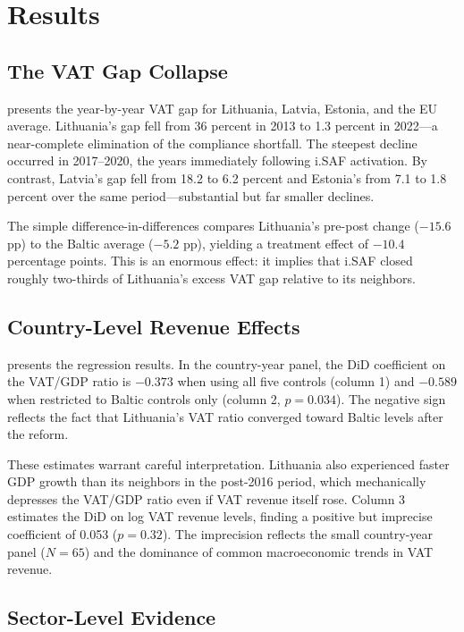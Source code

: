 \documentclass[12pt]{article}
\begin{document}
\section{Results}

\subsection{The VAT Gap Collapse}

 presents the year-by-year VAT gap for Lithuania, Latvia, Estonia, and the EU average. Lithuania's gap fell from 36 percent in 2013 to 1.3 percent in 2022---a near-complete elimination of the compliance shortfall. The steepest decline occurred in 2017--2020, the years immediately following i.SAF activation. By contrast, Latvia's gap fell from 18.2 to 6.2 percent and Estonia's from 7.1 to 1.8 percent over the same period---substantial but far smaller declines.

The simple difference-in-differences compares Lithuania's pre-post change ($-15.6$ pp) to the Baltic average ($-5.2$ pp), yielding a treatment effect of $-10.4$ percentage points. This is an enormous effect: it implies that i.SAF closed roughly two-thirds of Lithuania's excess VAT gap relative to its neighbors.

\subsection{Country-Level Revenue Effects}

 presents the regression results. In the country-year panel, the DiD coefficient on the VAT/GDP ratio is $-0.373$ when using all five controls (column 1) and $-0.589$ when restricted to Baltic controls only (column 2, $p = 0.034$). The negative sign reflects the fact that Lithuania's VAT ratio converged toward Baltic levels after the reform.

These estimates warrant careful interpretation. Lithuania also experienced faster GDP growth than its neighbors in the post-2016 period, which mechanically depresses the VAT/GDP ratio even if VAT revenue itself rose. Column 3 estimates the DiD on log VAT revenue levels, finding a positive but imprecise coefficient of 0.053 ($p = 0.32$). The imprecision reflects the small country-year panel ($N = 65$) and the dominance of common macroeconomic trends in VAT revenue.

\subsection{Sector-Level Evidence}
\end{document}
